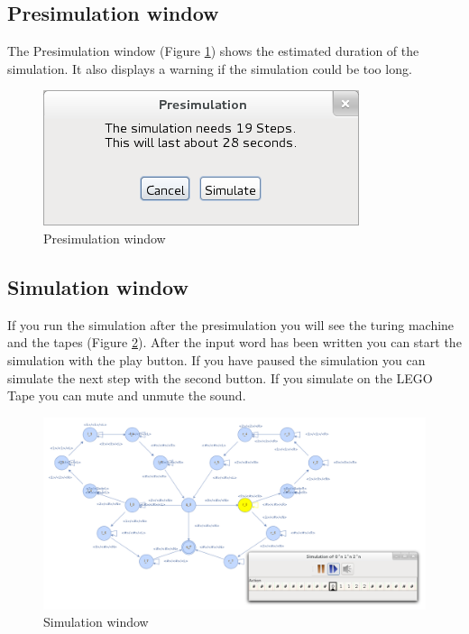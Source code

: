 \documentclass[%
  a4paper,%
  11pt,%
  blue,%
  hyperref	%
  ]{tubsartcl}
\begin{document}
\subsection{Presimulation window}
The Presimulation window (Figure \ref{pic:presimulation}) shows the estimated duration of the simulation. It also displays a warning if the simulation could be too long.
\begin{figure}[!htb]
\begin{center}
\includegraphics[scale=0.4]{graphics_gui/presimulation.png}
\end{center}
\caption{Presimulation window}
\label{pic:presimulation}
\end{figure}

\subsection{Simulation window}
If you run the simulation after the presimulation you will see the turing machine and the tapes (Figure \ref{pic:simulation_window}). After the input word has been written you can start the simulation with the play button. If you have paused the simulation you can simulate the next step with the second button. If you simulate on the LEGO\textregistered\, Tape you can mute and unmute the sound.
\begin{figure}[!htb]
\begin{center}
\includegraphics[scale=0.35]{graphics_gui/simulation_window.png}
\end{center}
\caption{Simulation window}
\label{pic:simulation_window}
\end{figure}
\end{document}
